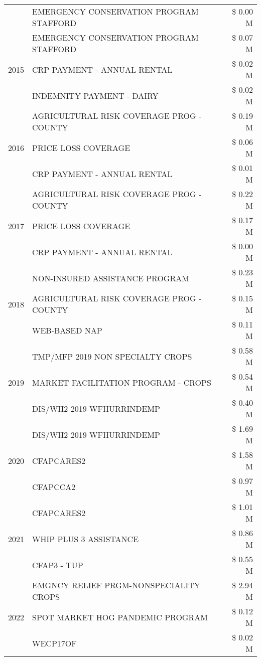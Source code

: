 \begin{tabular}{llr}
 & EMERGENCY CONSERVATION PROGRAM STAFFORD & \$ 0.00 M \\
\cline{1-3}
\multirow[t]{3}{*}{2015} & EMERGENCY CONSERVATION PROGRAM STAFFORD & \$ 0.07 M \\
 & CRP PAYMENT - ANNUAL RENTAL & \$ 0.02 M \\
 & INDEMNITY PAYMENT - DAIRY & \$ 0.02 M \\
\cline{1-3}
\multirow[t]{3}{*}{2016} & AGRICULTURAL RISK COVERAGE PROG - COUNTY & \$ 0.19 M \\
 & PRICE LOSS COVERAGE & \$ 0.06 M \\
 & CRP PAYMENT - ANNUAL RENTAL & \$ 0.01 M \\
\cline{1-3}
\multirow[t]{3}{*}{2017} & AGRICULTURAL RISK COVERAGE PROG - COUNTY & \$ 0.22 M \\
 & PRICE LOSS COVERAGE & \$ 0.17 M \\
 & CRP PAYMENT - ANNUAL RENTAL & \$ 0.00 M \\
\cline{1-3}
\multirow[t]{3}{*}{2018} & NON-INSURED ASSISTANCE PROGRAM & \$ 0.23 M \\
 & AGRICULTURAL RISK COVERAGE PROG - COUNTY & \$ 0.15 M \\
 & WEB-BASED NAP & \$ 0.11 M \\
\cline{1-3}
\multirow[t]{3}{*}{2019} & TMP/MFP 2019 NON SPECIALTY CROPS & \$ 0.58 M \\
 & MARKET FACILITATION PROGRAM - CROPS & \$ 0.54 M \\
 & DIS/WH2 2019 WFHURRINDEMP & \$ 0.40 M \\
\cline{1-3}
\multirow[t]{3}{*}{2020} & DIS/WH2 2019 WFHURRINDEMP & \$ 1.69 M \\
 & CFAPCARES2 & \$ 1.58 M \\
 & CFAPCCA2 & \$ 0.97 M \\
\cline{1-3}
\multirow[t]{3}{*}{2021} & CFAPCARES2 & \$ 1.01 M \\
 & WHIP PLUS 3 ASSISTANCE & \$ 0.86 M \\
 & CFAP3 - TUP & \$ 0.55 M \\
\cline{1-3}
\multirow[t]{3}{*}{2022} & EMGNCY RELIEF PRGM-NONSPECIALITY CROPS & \$ 2.94 M \\
 & SPOT MARKET HOG PANDEMIC PROGRAM & \$ 0.12 M \\
 & WECP17OF & \$ 0.02 M \\
\cline{1-3}
\bottomrule
\end{tabular}
